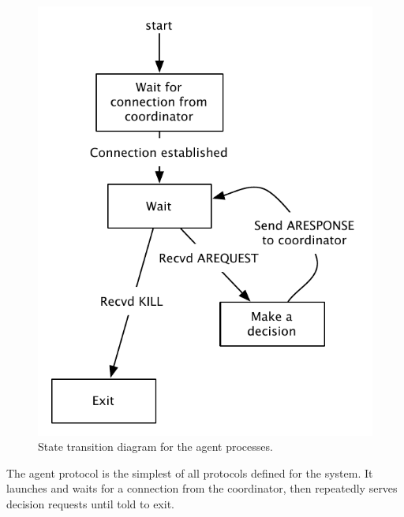 \begin{figure}
    \begin{center}
        \includegraphics[scale=0.5]{figures/state_agent.pdf}
    \end{center}
    \caption{State transition diagram for the agent processes.}
    \label{agent}
\end{figure}

The agent protocol is the simplest of all protocols defined for the system. It launches and waits for a connection from the coordinator, then repeatedly serves decision requests until told to exit.


